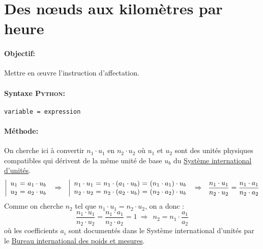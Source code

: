 \documentclass[11pt,a4paper,colorlinks,breaklinks]{article}
\def\python{\textsc{Python}}
\begin{document}

\newpage
\setcounter{section}{1}
\section{Des n\oe uds aux kilomètres par heure}\label{mrv:noeuds}
\paragraph{Objectif:} Mettre en \oe uvre l'instruction d'affectation.

\paragraph{Syntaxe \python:} \texttt{variable = expression}

\paragraph{}\mbox{}

\noindent{}

\paragraph{Méthode:}
On cherche ici à convertir $n_1\cdot u_1$ en $n_2\cdot u_2$ 
où $u_1$ et $u_2$ sont des unités physiques compatibles 
qui dérivent de la même unité de base $u_b$ du \href{http://www.bipm.org/fr/si/}{Système international d'unités}.
$$\left|\begin{array}{l@{\ =\ }r}
u_1 & a_1\cdot u_b \\
u_2 & a_2\cdot u_b
\end{array}\right.
\ \Rightarrow\ \ 
\left|\begin{array}{l@{\ =\ }r@{\ =\ }r}
n_1\cdot u_1 & n_1\cdot (a_1\cdot u_b) & (n_1\cdot a_1)\cdot u_b\\
n_2\cdot u_2 & n_2\cdot (a_2\cdot u_b) & (n_2\cdot a_2)\cdot u_b
\end{array}\right.
\ \Rightarrow\ \ \frac{n_1\cdot u_1}{n_2\cdot u_2} = \frac{n_1\cdot a_1}{n_2\cdot a_2}$$
Comme on cherche $n_2$ tel que $n_1\cdot u_1 = n_2\cdot u_2$, on a donc :
$$\frac{n_1\cdot u_1}{n_2\cdot u_2} = \frac{n_1\cdot a_1}{n_2\cdot a_2} = 1
\ \Rightarrow\ \ n_2 = n_1 \cdot \frac{a_1}{a_2}$$
où les coefficients $a_i$ sont documentés dans le Système international d'unités par le
\href{http://www.bipm.org/}{Bureau international des poids et mesures}.
\end{document}
